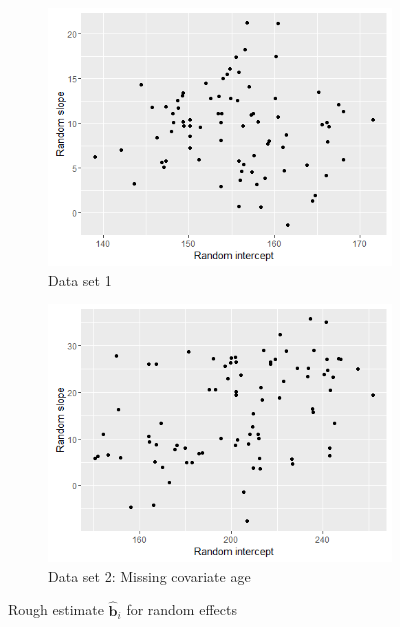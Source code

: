 \begin{figure}[!htb]
\centering
\captionsetup{justification=centering}
	\begin{subfigure}[b]{0.4\textwidth}
		\includegraphics[width=\textwidth]{mainmatter/chapter_5_simulation_study/ds_simple_randplot.png}
       \caption{\label{fig : ds_simple_randplot}Data set 1}
	\end{subfigure}    
	\begin{subfigure}[b]{0.4\textwidth}
		\includegraphics[width=\textwidth]{mainmatter/chapter_5_simulation_study/missing_continuous_covariate_randplot.png}
       \caption{\label{fig : missing_continuous_covariate_randplot} Data set 2: Missing covariate age}
	\end{subfigure}     
\caption{\label{fig : ds_simple_n_3wellsep}Rough estimate $\boldsymbol{\hat{b}}_i$ for random effects}
\end{figure}

